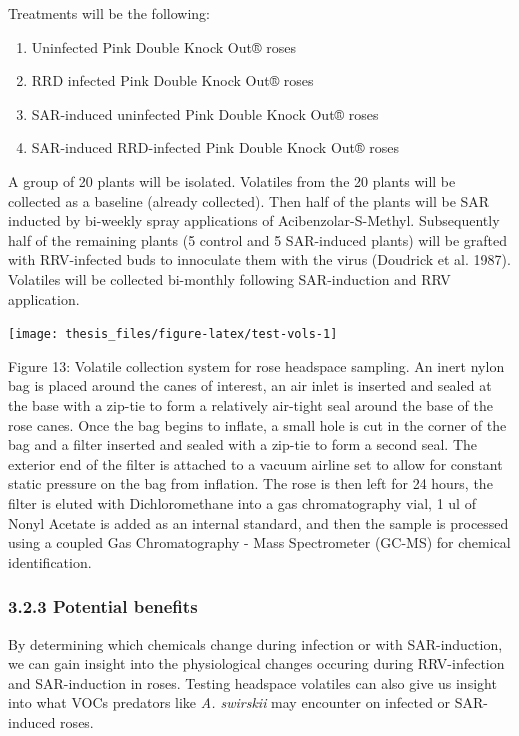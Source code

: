\documentclass[12pt,final,CPage]{ufthesis}
\begin{document}
{  Treatments will be the following:
  \begin{enumerate}
  \def\labelenumi{\arabic{enumi}.}
  \tightlist
  \item
    Uninfected Pink Double Knock Out® roses
  \item
    RRD infected Pink Double Knock Out® roses
  \item
    SAR-induced uninfected Pink Double Knock Out® roses
  \item
    SAR-induced RRD-infected Pink Double Knock Out® roses
  \end{enumerate}
  A group of 20 plants will be isolated. Volatiles from the 20 plants will be collected as a baseline (already collected). Then half of the plants will be SAR inducted by bi-weekly spray applications of Acibenzolar-S-Methyl. Subsequently half of the remaining plants (5 control and 5 SAR-induced plants) will be grafted with RRV-infected buds to innoculate them with the virus (Doudrick et al. 1987). Volatiles will be collected bi-monthly following SAR-induction and RRV application.
  \begin{center}\texttt{[image: thesis\_files/figure-latex/test-vols-1]} \end{center}

  Figure 13: Volatile collection system for rose headspace sampling. An inert nylon bag is placed around the canes of interest, an air inlet is inserted and sealed at the base with a zip-tie to form a relatively air-tight seal around the base of the rose canes. Once the bag begins to inflate, a small hole is cut in the corner of the bag and a filter inserted and sealed with a zip-tie to form a second seal. The exterior end of the filter is attached to a vacuum airline set to allow for constant static pressure on the bag from inflation. The rose is then left for 24 hours, the filter is eluted with Dichloromethane into a gas chromatography vial, 1 ul of Nonyl Acetate is added as an internal standard, and then the sample is processed using a coupled Gas Chromatography - Mass Spectrometer (GC-MS) for chemical identification.

  \hypertarget{potential-benefits-1}{%
  \subsubsection{3.2.3 Potential benefits}\label{potential-benefits-1}}

  By determining which chemicals change during infection or with SAR-induction, we can gain insight into the physiological changes occuring during RRV-infection and SAR-induction in roses. Testing headspace volatiles can also give us insight into what VOCs predators like \emph{A. swirskii} may encounter on infected or SAR-induced roses.

}
\end{document}
